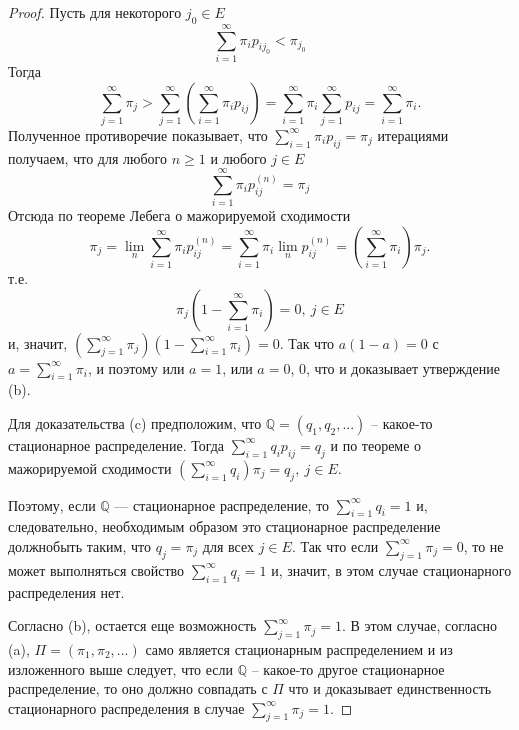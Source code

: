 \begin{theorem}
\begin{proof}
Пусть для некоторого $j_0 \in E$
\begin{equation}\label{eq4}
\sum_{i = 1}^{\infty} \pi_i p_{i j_0} < \pi_{j_0}
\end{equation}
Тогда
$$
\sum_{j = 1}^{\infty} \pi_j > \sum_{j = 1}^{\infty} \left( \sum_{i = 1}^{\infty} \pi_i p_{ij} \right) = \sum_{i = 1}^{\infty} \pi_i \sum_{j = 1}^{\infty} p_{ij} = \sum_{i = 1}^{\infty} \pi_i.
$$
Полученное противоречие показывает, что $\sum\limits_{i = 1}^{\infty} \pi_i p_{ij} = \pi_j$ итерациями получаем, что для любого $n \geq 1$ и любого $j \in E$
$$
\sum_{i = 1}^{\infty} \pi_i p_{ij}^{(n)} = \pi_j
$$
Отсюда по теореме Лебега о мажорируемой сходимости
$$
\pi_j = \lim_n \sum_{i = 1}^{\infty} \pi_i p_{ij}^{(n)} = \sum_{i = 1}^{\infty} \pi_i \lim_n p_{ij}^{(n)} = \left( \sum_{i = 1}^{\infty} \pi_i \right) \pi_j.
$$
т.е.
$$
\pi_j \left( 1 - \sum_{i = 1}^{\infty} \pi_i \right) = 0, \  j \in E
$$
и, значит, $\left( \sum\limits_{j = 1}^{\infty} \pi_j \right) \left( 1 - \sum_{i = 1}^{\infty} \pi_i \right) = 0$. Так что $a (1 - a) = 0$ с $a = \sum\limits_{i = 1}^{\infty} \pi_i$, и поэтому или $a = 1$, или $a = 0$, 0, что и доказывает утверждение (b).

Для доказательства (c) предположим, что $\mathbb{Q} = (q_1, q_2, ...)$ -- какое-то стационарное распределение. Тогда $\sum\limits_{i = 1}^{\infty} q_i p_{ij} = q_j$ и по теореме о мажорируемой сходимости $\left( \sum\limits_{i = 1}^{\infty} q_i \right) \pi_j = q_j, \  j \in E$.

Поэтому, если $\mathbb{Q}$ — стационарное распределение, то $\sum\limits_{i = 1}^{\infty} q_i = 1$ и, следовательно, необходимым образом это стационарное распределение должнобыть таким, что $q_j = \pi_j$ для всех $j \in E$. Так что если $\sum\limits_{j = 1}^{\infty} \pi_j = 0$, то не может выполняться свойство $\sum\limits_{i = 1}^{\infty} q_i = 1$ и, значит, в этом случае стационарного распределения нет.

Согласно (b), остается еще возможность $\sum\limits_{j = 1}^{\infty} \pi_j = 1$. В этом случае, согласно (a), $\Pi = (\pi_1, \pi_2, ...)$ само является стационарным распределением и из изложенного выше следует, что если $\mathbb{Q}$ -- какое-то другое стационарное распределение, то оно должно совпадать с $\Pi$ что и доказывает единственность стационарного распределения в случае $\sum\limits_{j = 1}^{\infty} \pi_j = 1$.

\end{proof}
\end{theorem}

